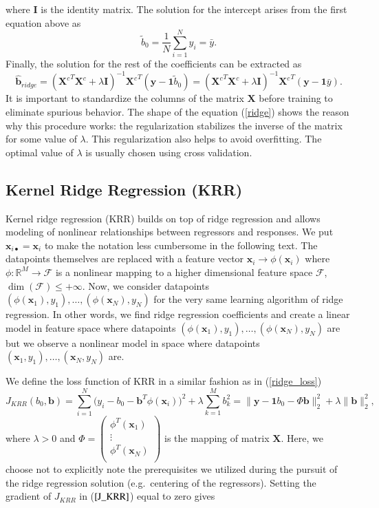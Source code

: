 \documentclass[11pt,oneside,czech,american]{book} %
\theoremstyle{definition} %
\theoremstyle{definition}
\begin{document}
where $\bm{I}$ is the identity matrix. The solution for the intercept arises from the first equation above as
\begin{equation}
	\tilde{b}_0 = \frac{1}{N} \sum_{i=1}^{N} y_i = \bar{y}.
	\label{b_0_ridge}
\end{equation}
Finally, the solution for the rest of the coefficients can be extracted as
\begin{equation}
	\bm{\hat{b}}_{ridge} = ({\bm{X}^{c}}^{T} {\bm{X}^{c}} + \lambda \bm{I})^{-1} {\bm{X}^{c}}^{T} (\bm{y} - \bm{1} \tilde{b}_0) = ({\bm{X}^{c}}^{T} {\bm{X}^{c}} + \lambda \bm{I})^{-1} {\bm{X}^{c}}^{T} (\bm{y} - \bm{1} \bar{y}).
	\label{ridge}
\end{equation}
It is important to standardize the columns of the matrix $\bm{X}$ before training to eliminate spurious behavior. The shape of the equation (\ref{ridge}) shows the reason why this procedure works: the regularization stabilizes the inverse of the matrix for some value of $\lambda$. This regularization also helps to avoid overfitting. The optimal value of $\lambda$ is usually chosen using cross validation.

\subsection{Kernel Ridge Regression (KRR)}
Kernel ridge regression (KRR) builds on top of ridge regression and allows modeling of nonlinear relationships between regressors and responses. We put $\bm{x}_{i \bullet} = \bm{x}_i$ to make the notation less cumbersome in the following text. The datapoints themselves are replaced with a feature vector $\bm{x}_i \rightarrow \phi(\bm{x}_i) $ where $\phi: \mathbb{R}^{M} \rightarrow \mathcal{F}$ is a nonlinear mapping to a higher dimensional feature space $\mathcal{F}$, $\dim(\mathcal{F}) \leq +\infty$. Now, we consider datapoints $(\phi(\bm{x}_1),y_1), \dots , (\phi(\bm{x}_N), y_N)$ for the very same learning algorithm of ridge regression. In other words, we find ridge regression coefficients and create a linear model in feature space where datapoints $(\phi(\bm{x}_1),y_1), \dots , (\phi(\bm{x}_N), y_N)$ are but we observe a nonlinear model in space where datapoints $(\bm{x}_1,y_1), \dots , (\bm{x}_N, y_N)$ are.

We define the loss function of KRR in a similar fashion as in (\ref{ridge_loss})
\begin{equation}
	J_{KRR}(b_0, \bm{b}) = \sum_{i=1}^{N}\Big( y_i - b_0 -\bm{b}^T \phi(\bm{x}_i) \Big)^2 + \lambda \sum_{k=1}^{M} b_k^2 = \| \bm{y} - \bm{1}b_0 -\Phi \bm{b} \|^2_2 + \lambda \| \bm{b} \|^2_2,
	\label{J_KRR}
\end{equation}
where $\lambda >0$ and $\Phi = \begin{pmatrix}
	\phi^T (\bm{x}_1) \\
	\vdots \\
	\phi^T (\bm{x}_N) \\
\end{pmatrix}$ is the mapping of matrix $\bm{X}$. Here, we choose not to explicitly note the prerequisites we utilized during the pursuit of the ridge regression solution (e.g.\ centering of the regressors). Setting the gradient of $J_{KRR}$ in ($\ref{J_KRR}$) equal to zero gives
\end{document}

